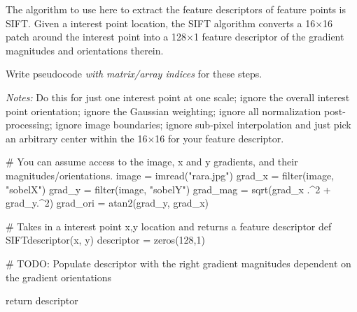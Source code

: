 The algorithm to use here to extract the feature descriptors of feature points is SIFT. Given a interest point location, the SIFT algorithm converts a 16$\times$16 patch around the interest point into a 128$\times$1 feature descriptor of the gradient magnitudes and orientations therein. 

Write pseudocode \emph{with matrix/array indices} for these steps.

\emph{Notes:} Do this for just one interest point at one scale; ignore the overall interest point orientation; ignore the Gaussian weighting; ignore all normalization post-processing; ignore image boundaries; ignore sub-pixel interpolation and just pick an arbitrary center within the 16$\times$16 for your feature descriptor.



\begin{python}
# You can assume access to the image, x and y gradients, and their magnitudes/orientations.
image = imread("rara.jpg")
grad_x = filter(image, "sobelX")
grad_y = filter(image, "sobelY")
grad_mag = sqrt(grad_x .^2 + grad_y.^2)
grad_ori = atan2(grad_y, grad_x)

# Takes in a interest point x,y location and returns a feature descriptor
def SIFTdescriptor(x, y)
    descriptor = zeros(128,1)
    
    # TODO: Populate descriptor with the right gradient magnitudes dependent on the gradient orientations

    return descriptor
\end{python}




%
%



